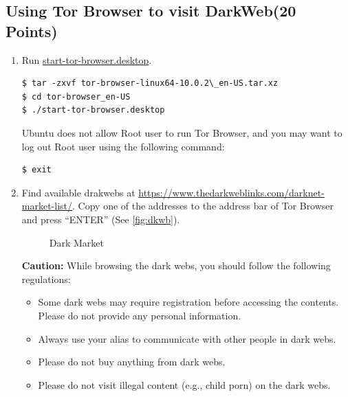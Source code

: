\documentclass[11pt]{article}
\newcommand{\torbw}{{\sf Tor Browser}\xspace}
\newcommand{\darkweb}{{\sf DarkWeb}\xspace}
\begin{document}
\begin{enumerate}
\subsection{Using \torbw to visit \darkweb (20 Points)} 
\label{subsec:usetorbw}
\begin{enumerate}

\item Run \url{start-tor-browser.desktop}.
 \begin{lstlisting}
$ tar -zxvf tor-browser-linux64-10.0.2\_en-US.tar.xz
$ cd tor-browser_en-US
$ ./start-tor-browser.desktop
\end{lstlisting}\vspace{-6mm}
Ubuntu does not allow Root user to run \torbw, and you may want to log out Root user using the following command: 
 \begin{lstlisting}
$ exit
\end{lstlisting}\vspace{-6mm} 

\item Find available drakwebs at \url{https://www.thedarkweblinks.com/darknet-market-list/}. Copy one of the addresses to the address bar of \torbw and press ``ENTER'' (See \autoref{fig:dkwb}). 

\begin{figure}[h]
\centering
{}
\caption{Dark Market}\label{fig:dkwb}
\end{figure}


\textbf{Caution:} While browsing the dark webs, you should follow the following regulations:   
\begin{itemize}
\item Some dark webs may require registration before accessing the contents. Please do not provide any personal information. 
\item Always use your alias to communicate with other people in dark webs. 
\item Please do not buy anything from dark webs.
\item Please do not visit illegal content (e.g., child porn) on the dark webs.
\end{itemize}


\end{enumerate}
\end{enumerate}
\end{document}
